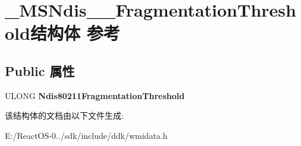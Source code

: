 \hypertarget{struct___m_s_ndis__80211___fragmentation_threshold}{}\section{\+\_\+\+M\+S\+Ndis\+\_\+\_\+\+Fragmentation\+Threshold结构体 参考}
\label{struct___m_s_ndis__80211___fragmentation_threshold}
\subsection*{Public 属性}
\begin{DoxyCompactItemize}
\item 
\mbox{\label{struct___m_s_ndis__80211___fragmentation_threshold_ac7dc880f0220a3b21f983c5a8c746ebe}} 
U\+L\+O\+NG {\bfseries Ndis80211\+Fragmentation\+Threshold}
\end{DoxyCompactItemize}


该结构体的文档由以下文件生成\+:\begin{DoxyCompactItemize}
\item 
E\+:/\+React\+O\+S-\/0../sdk/include/ddk/wmidata.\+h\end{DoxyCompactItemize}
